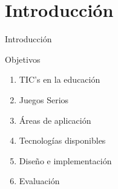 \section{Introducción}

\begin{frame}{Introducción}
\end{frame}
\begin{frame}{Objetivos}
\begin{enumerate}[<+->]
\item TIC's en la educación
\item Juegos Serios
\item Áreas de aplicación
\item Tecnologías disponibles
\item Diseño e implementación
\item Evaluación 
\end{enumerate}
\end{frame}

